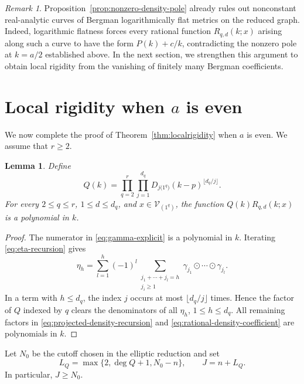 \documentclass[11pt,reqno]{amsart}
\newtheorem{lemma}[theorem]{Lemma}
\theoremstyle{corollary}
\theoremstyle{conjecture}
\theoremstyle{assumption}
\theoremstyle{proposition}
\theoremstyle{remark}
\newtheorem{remark}[theorem]{Remark}
\numberwithin{equation}{section}
\begin{document}
\begin{remark}
Proposition~\ref{prop:nonzero-density-pole} already rules out nonconstant real-analytic curves of Bergman logarithmically flat metrics on the reduced graph. Indeed, logarithmic flatness forces every rational function $R_{q,d}(k;x)$ arising along such a curve to have the form $P(k)+c/k$, contradicting the nonzero pole at $k=a/2$ established above. In the next section, we strengthen this argument to obtain local rigidity from the vanishing of finitely many Bergman coefficients.
\end{remark}


\section{Local rigidity when $a$ is even}
\label{sec:local-rigidity-even}

We now complete the proof of Theorem~\ref{thm:localrigidity} when $a$ is even. We assume that $r\geq 2$.

\begin{lemma}\label{lem:common-denominator}
Define
\begin{equation}\label{eq:common-denominator}
Q(k)=\prod_{q=2}^{r}\prod_{j=1}^{d_q}D_{j\mathbf (1^q)}(k-p)^{\lfloor d_q/j\rfloor}.
\end{equation}
For every $2\leq q\leq r$, $1\leq d\leq d_q$, and $x\in\mathcal V_{(1^q)}$, the function $Q(k)R_{q,d}(k;x)$ is a polynomial in $k$.
\end{lemma}

\begin{proof}
The numerator in \eqref{eq:gamma-explicit} is a polynomial in $k$. Iterating \eqref{eq:eta-recursion} gives
\[
\eta_h=\sum_{l=1}^{h}(-1)^l\sum_{\substack{j_1+\cdots+j_l=h\\j_i\geq1}}\gamma_{j_1}\odot\cdots\odot\gamma_{j_l}.
\]
In a term with $h\leq d_q$, the index $j$ occurs at most $\lfloor d_q/j\rfloor$ times. Hence the factor of $Q$ indexed by $q$ clears the denominators of all $\eta_h$, $1\leq h\leq d_q$. All remaining factors in \eqref{eq:projected-density-recursion} and \eqref{eq:rational-density-coefficient} are polynomials in $k$.
\end{proof}

Let $N_0$ be the cutoff chosen in the elliptic reduction and set
\begin{equation}\label{eq:finite-coefficient-cutoff}
L_Q=\max\{2,\deg Q+1,N_0-n\},\qquad J=n+L_Q.
\end{equation}
In particular, $J\geq N_0$.
\end{document}
